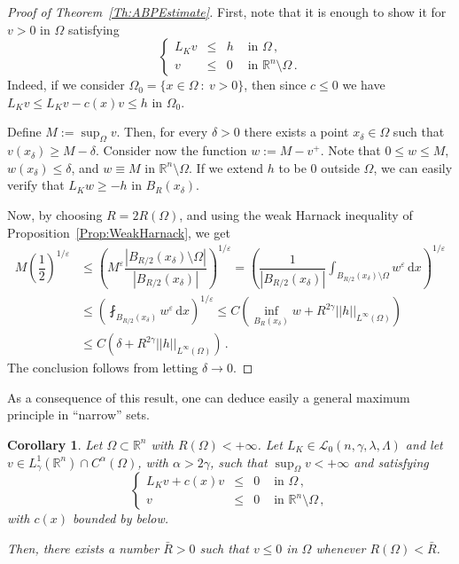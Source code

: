 \documentclass[12pt,reqno]{amsart}
\newtheorem{corollary}[theorem]{Corollary}
\theoremstyle{definition}
\theoremstyle{remark}
\newcommand{\con}[1]{\mathbb{#1}}
\newcommand{\R}{\con{R}} %
\newcommand{\lcal}{\mathcal{L}}
\newcommand{\norm}[1]{\left | \left |{#1} \right | \right |}
\newcommand{\s}{\gamma}
\renewcommand{\d}{\,\mathrm{d}} %
\newcommand{\bpar}[1]{\left ( {#1}\right )}
\newcommand\beqc[1]{\left\{\begin{array}{#1}}
\newcommand\eeqc{\end{array} \right.}
\def\PDEsystem{rcll}
\numberwithin{equation}{section}
\begin{document}
\begin{proof}[Proof of Theorem~\ref{Th:ABPEstimate}]
	First, note that it is enough to show it for $v > 0$ in $\Omega$ satisfying
	$$
	\beqc{\PDEsystem}
	L_K v &\leq & h & \text{ in } \Omega\,, \\
	v & \leq & 0 & \text{ in } \R^n\setminus \Omega\,.
	\eeqc
	$$
	Indeed, if we consider $\Omega_0 = \{x \in \Omega \ : \ v > 0\}$, then since $c \leq 0$ we have $L_K v \leq L_K v - c(x)v \leq h$ in $\Omega_0$.
	
	
	Define	$M:= \sup_\Omega v$. Then, for every $\delta >0$ there exists a point $x_\delta \in \Omega$ such that $v(x_\delta) \geq M - \delta$. Consider now the function $w := M - v^+$. Note that $0 \leq w \leq M$, $w(x_\delta) \leq \delta$, and $w \equiv M$ in $\R^n \setminus \Omega$. If we extend $h$ to be $0$ outside $\Omega$, we can easily verify that $L_K w \geq -h$ in $B_R(x_\delta)$.
	
	Now, by choosing $R= 2R(\Omega)$, and using the weak Harnack inequality of Proposition~\ref{Prop:WeakHarnack}, we get
	\begin{align*}
	M \left (\dfrac{1}{2}\right)^{1/\varepsilon} & \leq \bpar{M^{\varepsilon}\dfrac{|B_{R/2}(x_\delta)\setminus \Omega|}{|B_{R/2}(x_\delta)|}}^{1/\varepsilon}= \bpar{\dfrac{1}{|B_{R/2}(x_\delta)|} \int_{B_{R/2}(x_\delta)\setminus \Omega} w^\varepsilon \d x}^{1/\varepsilon} \\
	& \leq \bpar{ \fint_{B_{R/2}(x_\delta)} w^\varepsilon \d x}^{1/\varepsilon} \leq C \bpar{\inf_{B_{R}(x_\delta)} w + R^{2\s} \norm{h}_{L^{\infty}(\Omega)} } \\
	& \leq C \bpar{\delta + R^{2\s} \norm{h}_{L^{\infty}(\Omega)} }\,.
	\end{align*}
	The conclusion follows from letting $\delta \to 0$.
\end{proof}

As a consequence of this result, one can deduce easily a general maximum principle in ``narrow'' sets.

\begin{corollary}
	\label{Cor:MaxPpleNarrowDomains}
	Let $\Omega \subset \R^n$ with $R(\Omega) < +\infty$. Let $L_K \in \lcal_0(n,\s,\lambda, \Lambda)$ and let $v\in L^1_\s(\R^n)\cap C^{\alpha}(\Omega)$, with $\alpha > 2\s$, such that $\sup_{\Omega} v < +\infty$ and satisfying
	$$
	\beqc{\PDEsystem}
	L_K v + c(x)v &\leq & 0 & \text{ in } \Omega\,, \\
	v & \leq & 0 & \text{ in } \R^n\setminus \Omega\,,
	\eeqc
	$$
	with $c(x)$ bounded by below.
	
	Then, there exists a number $\bar{R} > 0$ such that $v \leq 0$ in $\Omega$ whenever $R(\Omega)< \bar{R}$.	
\end{corollary}
\end{document}

